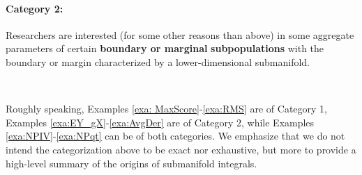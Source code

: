 \documentclass[12pt,american]{article}
\theoremstyle{definition}
\theoremstyle{plain}
\theoremstyle{definition}
\theoremstyle{plain}
\theoremstyle{plain}
\theoremstyle{plain}
\theoremstyle{plain}
\theoremstyle{plain}
\begin{document}
\paragraph{Category 2:} Researchers are interested (for some other reasons than above) in some aggregate parameters of certain \textbf{boundary or marginal} \textbf{subpopulations}  with the boundary or margin characterized by a lower-dimensional submanifold.

~

Roughly speaking, Examples \ref{exa: MaxScore}-\ref{exa:RMS} are of Category 1, Examples \ref{exa:EY_gX}-\ref{exa:AvgDer} are of Category 2, while Examples \ref{exa:NPIV}-\ref{exa:NPqt} can be of both categories. We emphasize that we do not intend the categorization above to be exact nor exhaustive, but more to provide a high-level summary of the origins of submanifold integrals.
\end{document}
